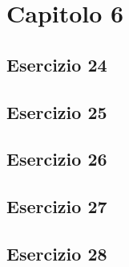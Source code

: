 \section{\textbf{Capitolo 6}}
\subsection{Esercizio 24}

\newpage
\subsection{Esercizio 25}

\newpage
\subsection{Esercizio 26}

\newpage
\subsection{Esercizio 27}

\newpage
\subsection{Esercizio 28}

\newpage
